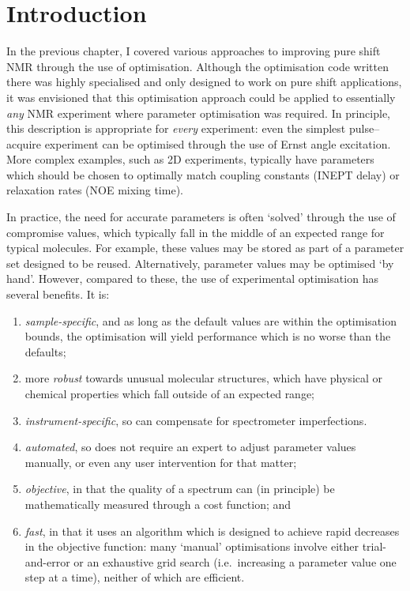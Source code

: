 \section{Introduction}
\label{sec:poise__introduction}

In the previous chapter, I covered various approaches to improving pure shift NMR through the use of optimisation.
Although the optimisation code written there was highly specialised and only designed to work on pure shift applications, it was envisioned that this optimisation approach could be applied to essentially \textit{any} NMR experiment where parameter optimisation was required.
In principle, this description is appropriate for \textit{every} experiment: even the simplest pulse--acquire experiment can be optimised through the use of Ernst angle excitation.
More complex examples, such as 2D experiments, typically have parameters which should be chosen to optimally match coupling constants (INEPT delay) or relaxation rates (NOE mixing time).

In practice, the need for accurate parameters is often `solved' through the use of compromise values, which typically fall in the middle of an expected range for typical molecules.
For example, these values may be stored as part of a parameter set designed to be reused.
Alternatively, parameter values may be optimised `by hand'.
However, compared to these, the use of experimental optimisation has several benefits.
It is:
\begin{enumerate}
    \item \textit{sample-specific}, and as long as the default values are within the optimisation bounds, the optimisation will yield performance which is no worse than the defaults;
    \item more \textit{robust} towards unusual molecular structures, which have physical or chemical properties which fall outside of an expected range;
    \item \textit{instrument-specific}, so can compensate for spectrometer imperfections.
    \item \textit{automated}, so does not require an expert to adjust parameter values manually, or even any user intervention for that matter;
    \item \textit{objective}, in that the quality of a spectrum can (in principle) be mathematically measured through a cost function; and
    \item \textit{fast}, in that it uses an algorithm which is designed to achieve rapid decreases in the objective function: many `manual' optimisations involve either trial-and-error or an exhaustive grid search (i.e.\ increasing a parameter value one step at a time), neither of which are efficient.
\end{enumerate}

